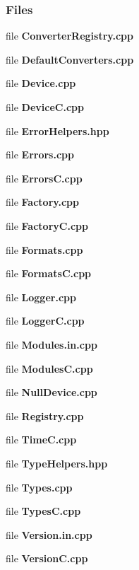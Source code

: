 \subsubsection*{Files}
\begin{DoxyCompactItemize}
\item 
file {\bf Converter\+Registry.\+cpp}
\item 
file {\bf Default\+Converters.\+cpp}
\item 
file {\bf Device.\+cpp}
\item 
file {\bf Device\+C.\+cpp}
\item 
file {\bf Error\+Helpers.\+hpp}
\item 
file {\bf Errors.\+cpp}
\item 
file {\bf Errors\+C.\+cpp}
\item 
file {\bf Factory.\+cpp}
\item 
file {\bf Factory\+C.\+cpp}
\item 
file {\bf Formats.\+cpp}
\item 
file {\bf Formats\+C.\+cpp}
\item 
file {\bf Logger.\+cpp}
\item 
file {\bf Logger\+C.\+cpp}
\item 
file {\bf Modules.\+in.\+cpp}
\item 
file {\bf Modules\+C.\+cpp}
\item 
file {\bf Null\+Device.\+cpp}
\item 
file {\bf Registry.\+cpp}
\item 
file {\bf Time\+C.\+cpp}
\item 
file {\bf Type\+Helpers.\+hpp}
\item 
file {\bf Types.\+cpp}
\item 
file {\bf Types\+C.\+cpp}
\item 
file {\bf Version.\+in.\+cpp}
\item 
file {\bf Version\+C.\+cpp}
\end{DoxyCompactItemize}
